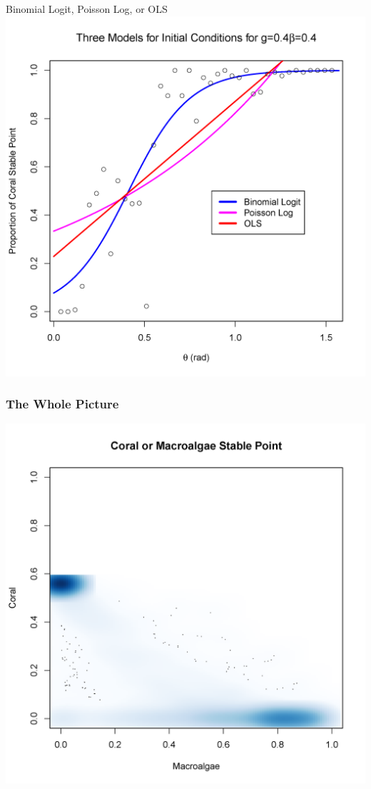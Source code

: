 \begin{frame}{Binomial Logit, Poisson Log, or OLS}
\includegraphics[scale=.325]{theta_threemodels.png}
\end{frame}

\begin{frame}\frametitle{The Whole Picture}
\includegraphics[scale=.325]{allscatter11.png}
\end{frame}

